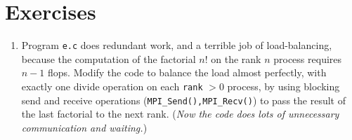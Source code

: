 \bigskip
\section{Exercises}

\renewcommand{\labelenumi}{\arabic{chapter}.\arabic{enumi}\quad}
\begin{enumerate}
\item Program \texttt{e.c} does redundant work, and a terrible job of load-balancing, because the computation of the factorial $n!$ on the rank $n$ process requires $n-1$ flops.  Modify the code to balance the load almost perfectly, with exactly one divide operation on each \texttt{rank} $>0$ process, by using blocking send and receive operations (\texttt{MPI\_Send(),MPI\_Recv()}) to pass the result of the last factorial to the next rank.  (\emph{Now the code does lots of unnecessary communication and waiting.})
\end{enumerate}